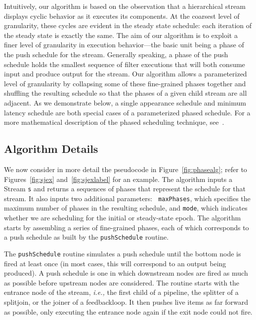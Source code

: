 \documentclass{sig-alt-full}
\begin{document}
Intuitively, our algorithm is based on the observation that a
hierarchical stream displays cyclic behavior as it executes its
components.  At the coarsest level of granularity, these cycles are
evident in the steady state schedule: each iteration of the steady
state is exactly the same.  The aim of our algorithm is to exploit a
finer level of granularity in execution behavior---the basic unit
being a phase of the push schedule for the stream.  Generally
speaking, a phase of the push schedule holds the smallest sequence of
filter executions that will both consume input and produce output for
the stream.  Our algorithm allows a parameterized level of granularity
by collapsing some of these fine-grained phases together and shuffling
the resulting schedule so that the phases of a given child stream are
all adjacent.  As we demonstrate below, a single appearance schedule
and minimum latency schedule are both special cases of a parameterized
phased schedule.  For a more mathematical description of the phased
scheduling technique, see~\cite{karczma-thesis}.

\subsection{Algorithm Details}

We now consider in more detail the pseudocode in
Figure~\ref{fig:phasealg}; refer to Figures~\ref{fig:sjex}
and~\ref{fig:sjexlabel} for an example.  The algorithm inputs a Stream
{\tt s} and returns a sequences of phases that represent the schedule
for that stream.  It also inputs two additional parameters: {\tt
maxPhases}, which specifies the maximum number of phases in the
resulting schedule, and {\tt mode}, which indicates whether we are
scheduling for the initial or steady-state epoch.  The algorithm
starts by assembling a series of fine-grained phases, each of which
corresponds to a push schedule as built by the {\tt pushSchedule}
routine.

The {\tt pushSchedule} routine simulates a push schedule until the
bottom node is fired at least once (in most cases, this will
correspond to an output being produced).  A push schedule is one in
which downstream nodes are fired as much as possible before upstream
nodes are considered.  The routine starts with the entrance node of
the stream, {\it i.e.,} the first child of a pipeline, the splitter of
a splitjoin, or the joiner of a feedbackloop.  It then pushes live
items as far forward as possible, only executing the entrance node
again if the exit node could not fire.
\end{document}
